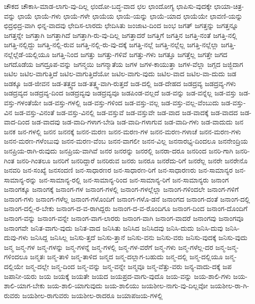 {ಚೌಕದ
ಚೌಕಾಸಿ-ಮಾಡ-ಲಾಗು-ವು-ದಿಲ್ಲ
ಛಂದೋ-ಬದ್ಧ-ವಾದ
ಛಲ
ಛಾಂದೋಗ್ಯ
ಛಾಪಿಸು-ವುದಕ್ಕೇ
ಛಾಯಾ-ಚಿತ್ರ-ವನ್ನು
ಛಾಯೆ
ಛಾಯೆ-ಗಳು
ಛಾಯೆ-ಗಳೇ
ಛಾಯೆಯ
ಛಾಯೆ-ಯನ್ನು
ಛಾಯೆ-ಯಾದ
ಛಾಯೆಯೇ
ಛಾವಣಿ-ಯನ್ನು
ಛಿದ್ರಛಿದ್ರ-ವಾಗಿ
ಛಿನ್ನ-ವಾದವು
ಛೇದಿಸ-ಲಾರದು
ಛೇದಿಸಿತು
ಜಂಜಾಟ-ದಿಂದ
ಜಂಭ
ಜಗತ್
ಜಗತ್ತನ್ನು
ಜಗತ್ತನ್ನೂ
ಜಗತ್ತನ್ನೇ
ಜಗತ್ತಾಗಿ
ಜಗತ್ತಾಗಿದೆ
ಜಗತ್ತಾಗಿ-ರು-ವು-ದಿಲ್ಲ
ಜಗತ್ತಾದರೆ
ಜಗತ್ತಿಗೆ
ಜಗತ್ತಿನ
ಜಗತ್ತಿ-ನಂತೆ
ಜಗತ್ತಿ-ನಲ್ಲಿ
ಜಗತ್ತಿ-ನಲ್ಲಿದ್ದು
ಜಗತ್ತಿ-ನಲ್ಲಿ-ರುವ
ಜಗತ್ತಿ-ನಲ್ಲಿ-ರು-ವು-ದಕ್ಕೆ
ಜಗತ್ತಿ-ನಲ್ಲೆ
ಜಗತ್ತಿ-ನಲ್ಲೆಲ್ಲ
ಜಗತ್ತಿ-ನಲ್ಲೆಲ್ಲಾ
ಜಗತ್ತಿ-ನಲ್ಲೆಲ್ಲೆಡೆ-ಯಲ್ಲಿಯೂ
ಜಗತ್ತಿ-ನಿಂದ
ಜಗತ್ತು
ಜಗತ್ತು-ಗಳಿವೆ
ಜಗತ್ತು-ಗಳು
ಜಗತ್ತೂ
ಜಗತ್ತೆಲ್ಲ
ಜಗತ್ತೇ
ಜಗದ
ಜಗದೊಡೆಯ
ಜಗದ್ರೂಪ-ವನ್ನು
ಜಗನ್ಮಯಿ
ಜಗನ್ಮಾತೆಯ
ಜಗಳ
ಜಗಳ-ಕಾಯುತ್ತಾ
ಜಗಳ-ವೆಲ್ಲಾ
ಜಗ್ಗದ
ಜಜ್ಜಿದಾಗ
ಜಟಿಲ
ಜಟಿಲ-ವಾಗುತ್ತಿದೆ
ಜಟಿಲ-ವಾಗುತ್ತಿದೆಯೋ
ಜಟಿಲ-ವಾಗು-ವುದು
ಜಟಿಲ-ವಾದ
ಜಟಿಲ-ವಾ-ದುದು
ಜಡ
ಜಡಕ್ಕೂ
ಜಡ-ಜೀವನ
ಜಡ-ತತ್ತ್ವದ
ಜಡ-ತತ್ತ್ವ-ವಾಗಿ-ರುತ್ತದೆ
ಜಡ-ದಲ್ಲಿ
ಜಡ-ದೇಹದ
ಜಡದ್ರವ್ಯ
ಜಡದ್ರವ್ಯ-ಗಳು
ಜಡದ್ರವ್ಯದ
ಜಡದ್ರವ್ಯ-ದಿಂದ
ಜಡದ್ರವ್ಯವು
ಜಡದ್ರವ್ಯವೂ
ಜಡಪಿಂಡ-ವಲ್ಲದೆ
ಜಡ-ವನ್ನು
ಜಡ-ವನ್ನೆಲ್ಲ
ಜಡ-ವಸ್ತು
ಜಡ-ವಸ್ತು-ಗಳಂತೆಯೇ
ಜಡ-ವಸ್ತು-ಗಳಲ್ಲಿ
ಜಡ-ವಸ್ತು-ಗಳಿಂದ
ಜಡ-ವಸ್ತು-ವಲ್ಲ
ಜಡ-ವಸ್ತು-ವಲ್ಲ-ವೆಂಬುದು
ಜಡ-ವಸ್ತು-ವಿನ
ಜಡ-ವಸ್ತು-ವಿನಂತೆ
ಜಡ-ವಸ್ತು-ವಿನಲ್ಲಿ
ಜಡ-ವಸ್ತುವೆ
ಜಡ-ವಸ್ತುವೇ
ಜಡ-ವಾದ
ಜಡ-ವಾದಕ್ಕೆ
ಜಡ-ವಾದದ
ಜಡ-ವಾದ-ದಿಂದ
ಜಡ-ವಾದವು
ಜಡ-ವಾದಿ-ಗಳಾಗ-ಬೇಡಿ
ಜಡ-ವಾದಿ-ಗಳಾಗುವ
ಜಡ-ವಾದಿ-ಗಳು
ಜಡ-ವಾದುದು
ಜನ
ಜನಕ
ಜನ-ಗಳಲ್ಲಿ
ಜನನ
ಜನನಕ್ಕೆ
ಜನನ-ಮರಣ
ಜನನ-ಮರಣ-ಗಳ
ಜನನ-ಮರಣ-ಗಳಾಚೆ
ಜನನ-ಮರಣ-ಗಳು
ಜನನ-ಮರಣ-ಗಳೆಂಬುವು
ಜನನ-ಮರಣ-ವೆಂಬ
ಜನನ-ವಾಗಲೀ
ಜನನ-ವಿಲ್ಲ
ಜನನಾರಭ್ಯ-ದಿಂದಲೂ
ಜನನೇಂದ್ರಿಯ
ಜನಪ್ರಿಯ-ರಾಗಿ-ರುವುದು
ಜನಪ್ರಿಯ-ವಾಗಿವೆ
ಜನರ
ಜನರನ್ನು
ಜನರಲ್ಲಿ
ಜನರಾ-ದರೂ
ಜನರಿಂದ
ಜನರಿ-ಗಾಗಿ
ಜನರಿ-ಗಿಂತ
ಜನರಿ-ಗಿಂತಲೂ
ಜನರಿಗೆ
ಜನರಿದ್ದಾರೆ
ಜನರಿರುವ
ಜನರು
ಜನರೂ
ಜನರೆದು-ರಿಗೆ
ಜನರೆಲ್ಲ
ಜನರೇ
ಜನರೇನೊ
ಜನವರಿ
ಜನ-ಸಂಖ್ಯೆ
ಜನಸಂದಣಿ
ಜನ-ಸಾಧಾರಣರ
ಜನ-ಸಾಧಾರಣ-ರಿಗೆ
ಜನ-ಸಾಧಾರಣರು
ಜನ-ಸಾಮಾನ್ಯರ
ಜನ-ಸಾಮಾನ್ಯ-ರನ್ನು
ಜನ-ಸಾಮಾನ್ಯ-ರಲ್ಲಿ
ಜನ-ಸಾಮಾನ್ಯ-ರಿಂದ
ಜನ-ಸಾಮಾನ್ಯ-ರಿಗೆ
ಜನ-ಸಾಮಾನ್ಯರು
ಜನಾಂಗ
ಜನಾಂಗಕ್ಕೂ
ಜನಾಂಗಕ್ಕೆ
ಜನಾಂಗ-ಗಳ
ಜನಾಂಗ-ಗಳಲ್ಲಿ
ಜನಾಂಗ-ಗಳಲ್ಲೆಲ್ಲಾ
ಜನಾಂಗ-ಗಳಿಂದಲೇ
ಜನಾಂಗ-ಗಳಿಗೆ
ಜನಾಂಗ-ಗಳು
ಜನಾಂಗ-ಗಳೆಲ್ಲ
ಜನಾಂಗ-ಗಳೊಂದಿಗೆ
ಜನಾಂಗ-ಗಳೊ-ಡನೆ
ಜನಾಂಗದ
ಜನಾಂಗ-ದಂತೆ
ಜನಾಂಗ-ದಲ್ಲಿ
ಜನಾಂಗ-ದಲ್ಲಿ-ರ-ಬೇಕು
ಜನಾಂಗ-ದ-ವ-ರಾಗಿದ್ದರು
ಜನಾಂಗ-ದ-ವ-ರೊಂದಿಗೂ
ಜನಾಂಗ-ದಿಂದ
ಜನಾಂಗ-ದೊಂದಿಗೆ
ಜನಾಂಗ-ವನ್ನು
ಜನಾಂಗ-ವನ್ನೇ
ಜನಾಂಗ-ವಾಗ-ಲಾರರು
ಜನಾಂಗ-ವಾಗಿ
ಜನಾಂಗ-ವಾದರೆ
ಜನಾಂಗವು
ಜನಾಂಗವೂ
ಜನಾಂಗವೇ
ಜನಿತ-ವಾಗು-ವುದು
ಜನಿತ-ವಾದ
ಜನಿಸಿತು
ಜನಿಸಿದ
ಜನಿಸಿದವು
ಜನಿಸಿ-ದುದು
ಜನಿಸಿ-ದುವು
ಜನಿಸಿ-ದುವು-ಗಳು
ಜನಿಸಿದ್ದ
ಜನಿಸಿಲ್ಲ
ಜನಿಸು-ತ್ತದೆ
ಜನಿಸು-ತ್ತಾನೆ
ಜನಿಸು-ವನು
ಜನಿಸು-ವರು
ಜನಿಸು-ವುದಕ್ಕೆ
ಜನಿಸು-ವುದು
ಜನ್ಮ
ಜನ್ಮ-ಗಳ
ಜನ್ಮ-ಗಳನ್ನು
ಜನ್ಮ-ಗಳನ್ನೆ
ಜನ್ಮ-ಗಳಲ್ಲಿ
ಜನ್ಮ-ಗಳ-ವರೆಗೆ
ಜನ್ಮ-ಗಳು
ಜನ್ಮ-ಗಳೆಲ್ಲ-ದರ
ಜನ್ಮ-ಜನ್ಮ-ಗಳಿಂದಲೂ
ಜನ್ಮತಃ
ಜನ್ಮ-ತಾಳಿ
ಜನ್ಮ-ತಾಳಿದ
ಜನ್ಮದ
ಜನ್ಮ-ದಲ್ಲಾಗ-ಬಹುದು
ಜನ್ಮ-ದಲ್ಲಿ
ಜನ್ಮ-ದಲ್ಲಿಯೂ
ಜನ್ಮ-ದಲ್ಲಿಯೇ
ಜನ್ಮ-ದಲ್ಲೇ
ಜನ್ಮ-ದಿಂದ
ಜನ್ಮ-ವನ್ನು
ಜನ್ಮ-ವನ್ನೇ
ಜನ್ಮವೂ
ಜನ್ಮ-ವೆತ್ತು-ವರು
ಜನ್ಯ-ವಾದು-ದಕ್ಕೆ
ಜಪ
ಜಪಾನೀ-ಯರು
ಜಯ
ಜಯಕ್ಕೆ
ಜಯತೇ
ಜಯದ
ಜಯಪ್ರದ-ವಾಗು-ವುದೊ
ಜಯ-ವನ್ನು
ಜಯ-ಶಾಲಿ-ಗಳು
ಜಯ-ಶಾಲಿ-ಯಾಗ-ಬೇಕು
ಜಯ-ಶಾಲಿ-ಯಾಗುವುದು
ಜಯ-ಶಾಲಿಯು
ಜಯಶೀಲ-ನಾಗು-ವು-ದಿಲ್ಲವೋ
ಜಯಶೀಲ-ರಾ-ಗಿ-ರುವರು
ಜಯಶೀಲ-ರಾಗುವರು
ಜಯಶೀಲ-ರಾದರೂ
ಜಯಾಪಜಯ-ಗಳಲ್ಲಿ
}
